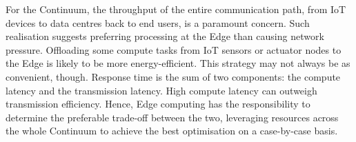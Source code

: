 
For the Continuum, the throughput of the entire communication path, from IoT devices to data centres back to end users, is a paramount concern. Such realisation suggests preferring processing at the Edge than causing network pressure. 
Offloading some compute tasks from IoT sensors or actuator nodes to the Edge is likely to be more energy-efficient. 
This strategy may not always be as convenient, though. 
Response time is the sum of two components: the compute latency and the transmission latency. High compute latency can outweigh transmission efficiency. 
Hence, Edge computing has the responsibility to determine the preferable trade-off between the two, leveraging resources across the whole Continuum to achieve the best optimisation on a case-by-case basis.


